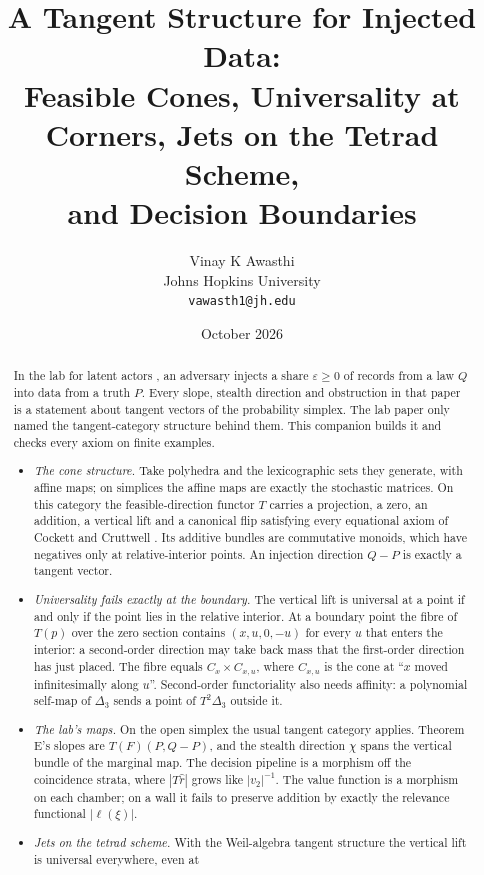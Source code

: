 \documentclass[11pt]{article}
\title{A Tangent Structure for Injected Data:\\ Feasible Cones, Universality at Corners, Jets on the Tetrad Scheme,\\ and Decision Boundaries}
\author{Vinay K Awasthi\\ Johns Hopkins University\\ \texttt{vawasth1@jh.edu}}
\date{October 2026}
\theoremstyle{definition}\newtheorem{definition}[theorem]{Definition}\newtheorem{remark}[theorem]{Remark}\newtheorem{example}[theorem]{Example}
\begin{document}
\maketitle

\begin{abstract}
In the lab for latent actors \cite{Lab}, an adversary injects a share $\varepsilon\ge0$ of records from a law $Q$ into data from a truth
$P$. Every slope, stealth direction and obstruction in that paper is a statement about tangent vectors of the probability simplex. The lab
paper only named the tangent-category structure behind them. This companion builds it and checks every axiom on finite examples.
\begin{itemize}
\item \emph{The cone structure.} Take polyhedra and the lexicographic sets they generate, with affine maps; on simplices the affine maps
  are exactly the stochastic matrices. On this category the feasible-direction functor $T$ carries a projection, a zero, an addition, a
  vertical lift and a canonical flip satisfying every equational axiom of Cockett and Cruttwell \cite{CockettCruttwell2014}. Its additive
  bundles are commutative monoids, which have negatives only at relative-interior points. An injection direction $Q-P$ is exactly a
  tangent vector.
\item \emph{Universality fails exactly at the boundary.} The vertical lift is universal at a point if and only if the point lies in the
  relative interior. At a boundary point the fibre of $T(p)$ over the zero section contains $(x,u,0,-u)$ for every $u$ that enters the
  interior: a second-order direction may take back mass that the first-order direction has just placed. The fibre equals
  $C_x\times C_{x,u}$, where $C_{x,u}$ is the cone at ``$x$ moved infinitesimally along $u$''. Second-order functoriality also needs
  affinity: a polynomial self-map of $\Delta_3$ sends a point of $T^2\Delta_3$ outside it.
\item \emph{The lab's maps.} On the open simplex the usual tangent category applies. Theorem E's slopes are $T(F)(P,Q-P)$, and the
  stealth direction $\chi$ spans the vertical bundle of the marginal map. The decision pipeline is a morphism off the coincidence
  strata, where $|T\hat r|$ grows like $|v_2|^{-1}$. The value function is a morphism on each chamber; on a wall it fails to preserve
  addition by exactly the relevance functional $|\ell(\xi)|$.
\item \emph{Jets on the tetrad scheme.} With the Weil-algebra tangent structure the vertical lift is universal everywhere, even at

\end{itemize}
\end{abstract}
\end{document}
